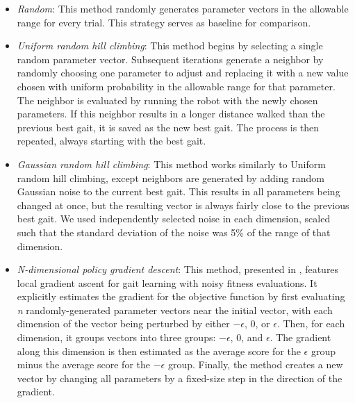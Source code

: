

\begin{itemize}

\item \emph{Random}: This method randomly generates parameter vectors
  in the allowable range for every trial. This strategy serves
  as baseline for comparison.

\item \emph{Uniform random hill climbing}:  This method begins by
  selecting a single random parameter vector.  Subsequent iterations
  generate a neighbor by randomly choosing one parameter to adjust and
  replacing it with a new value chosen with uniform probability in the
  allowable range for that parameter. The neighbor is evaluated by
  running the robot with the newly chosen parameters. If this neighbor
  results in a longer distance walked than the previous best gait, it
  is saved as the new best gait. The process is then repeated, always
  starting with the best gait.

\item \emph{Gaussian random hill climbing}: This method works
  similarly to Uniform random hill climbing, except neighbors are
  generated by adding random Gaussian noise to the current best gait.
  This results in all parameters being changed at once, but the
  resulting vector is always fairly close to the previous best gait.
  We used independently selected noise in each dimension, scaled such
  that the standard deviation of the noise was 5\% of the range of
  that dimension.

\item \emph{N-dimensional policy gradient descent}: This method, presented in \cite{kohl},
  features local gradient  ascent for gait
  learning with noisy fitness evaluations.  It explicitly estimates the
  gradient for the objective function by first
  evaluating \emph{n} randomly-generated parameter vectors near the
  initial vector, with each dimension of the vector being perturbed by
  either $-\epsilon$, $0$, or $\epsilon$. Then, for each dimension, it
  groups vectors into three groups: $-\epsilon$, $0$, and $\epsilon$.
  The gradient along this dimension is then estimated as the average
  score for the $\epsilon$ group minus the average score for the
  $-\epsilon$ group. Finally, the method creates a new vector by
  changing all parameters by a fixed-size step in the direction of the
  gradient.


\end{itemize}
